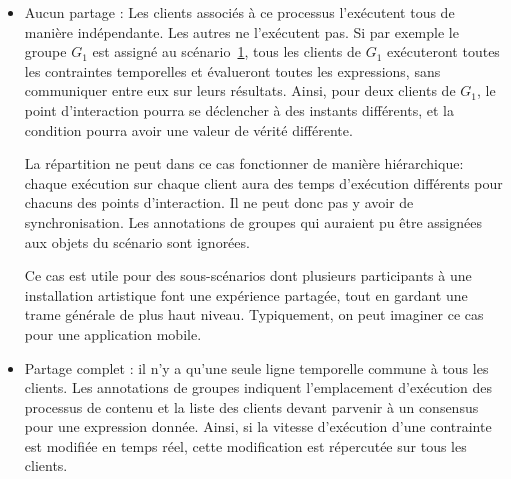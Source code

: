 \documentclass[10pt]{article}
\newcommand\trigger{point d'interaction\xspace}
\begin{document}
\begin{itemize}
    \item Aucun partage : Les clients associés à ce processus l'exécutent tous de manière indépendante.
    Les autres ne l'exécutent pas. 
    Si par exemple le groupe $G_1$ est assigné au scénario~\ref{scenar.general}, tous les clients de $G_1$ exécuteront toutes les contraintes temporelles et évalueront toutes les expressions, sans communiquer entre eux sur leurs résultats. 
    Ainsi, pour deux clients de $G_1$, le \trigger pourra se déclencher à des instants différents, et la condition pourra avoir une valeur de vérité différente.
    
    La répartition ne peut dans ce cas fonctionner de manière hiérarchique: chaque exécution sur chaque client aura des temps d'exécution différents pour chacuns des points d'interaction. 
    Il ne peut donc pas y avoir de synchronisation.
    Les annotations de groupes qui auraient pu être assignées aux objets du scénario sont ignorées. 
    
    Ce cas est utile pour des sous-scénarios dont plusieurs participants à une installation artistique font une expérience partagée, tout en gardant une trame générale de plus haut niveau. 
    Typiquement, on peut imaginer ce cas pour une application mobile.
    
    \begin{figure}[h]
        \centering
        \begin{tikzpicture}
        
        \end{tikzpicture}
        \label{scenar.general}
    \end{figure}
    
    \item Partage complet : il n'y a qu'une seule ligne temporelle commune à tous les clients. 
    Les annotations de groupes indiquent l'emplacement d'exécution des processus de contenu et la liste des clients devant parvenir à un consensus pour une expression donnée. 
    Ainsi, si la vitesse d'exécution d'une contrainte est modifiée en temps réel, cette modification est répercutée sur tous les clients.
    

\end{itemize}
\end{document}

